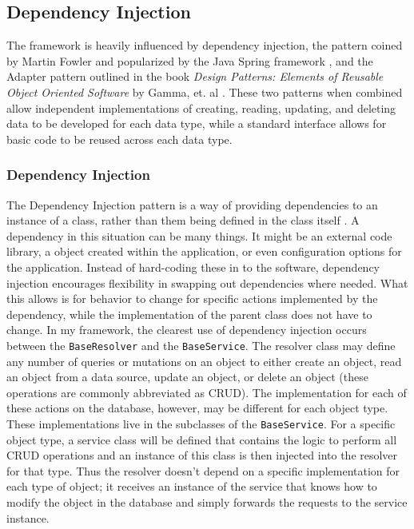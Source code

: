 \subsection{Dependency Injection}
The framework is heavily influenced by dependency injection, the pattern coined by Martin Fowler and popularized by the Java Spring framework \cite{fowlerInversionControlContainers2004}, and the Adapter pattern outlined in the book \textit{Design Patterns: Elements of Reusable Object Oriented Software} by Gamma, et. al \cite{gammaDesignPatternsElements1995}.  These two patterns when combined allow independent implementations of creating, reading, updating, and deleting data to be developed for each data type, while a standard interface allows for basic code to be reused across each data type.

\subsubsection{Dependency Injection}
The Dependency Injection pattern is a way of providing dependencies to an instance of a class, rather than them being defined in the class itself \cite{fowlerInversionControlContainers2004}. A dependency in this situation can be many things.  It might be an external code library, a object created within the application, or even configuration options for the application.  Instead of hard-coding these in to the software, dependency injection encourages flexibility in swapping out dependencies where needed. What this allows is for behavior to change for specific actions implemented by the dependency, while the implementation of the parent class does not have to change.  In my framework, the clearest use of dependency injection occurs between the \verb!BaseResolver! and the \verb!BaseService!.  The resolver class may define any number of queries or mutations on an object to either create an object, read an object from a data source, update an object, or delete an object (these operations are commonly abbreviated as CRUD).  The implementation for each of these actions on the database, however, may be different for each object type.  These implementations live in the subclasses of the \verb!BaseService!.  For a specific object type, a service class will be defined that contains the logic to perform all CRUD operations and an instance of this class is then injected into the resolver for that type.  Thus the resolver doesn't depend on a specific implementation for each type of object; it receives an instance of the service that knows how to modify the object in the database and simply forwards the requests to the service instance.

